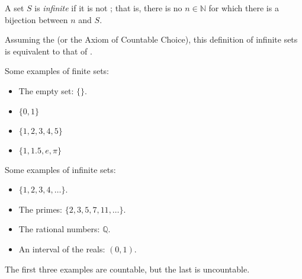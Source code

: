 \documentclass[12pt]{article}
\begin{document}

A set $S$ is \emph{infinite} if it is not ; that is, there is no $n \in \mathbb{N}$ for which there is a bijection between $n$ and $S$.  

Assuming the  (or the Axiom of Countable Choice), this definition of infinite sets is equivalent to that of .

Some examples of finite sets:

\begin{itemize}
\item The empty set: $\{\}$.
\item $\{0, 1\}$
\item $\{1, 2, 3, 4 , 5\}$
\item $\{1,1.5, e, \pi\}$
\end{itemize}

Some examples of infinite sets:

\begin{itemize}
\item $\{1, 2, 3, 4, \ldots\}$.
\item The primes: $\{2, 3, 5, 7, 11, \ldots\}$.
\item The rational numbers: $\mathbb{Q}$.
\item An interval of the reals: $(0, 1)$.
\end{itemize}

The first three examples are countable, but the last is uncountable.
\end{document}
